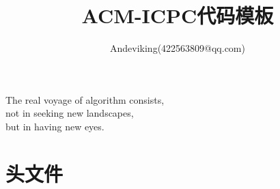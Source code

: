 \documentclass[twocolumn,a4]{article}
\title{\CJKfamily{hei} \bfseries ACM-ICPC代码模板}
\author{Andeviking(422563809@qq.com)}
\begin{document}
\small
\begin{titlepage}
    \maketitle
    \vspace{10cm}
    \hspace{5cm}
    \slshape
    \begin{LARGE}
        The real voyage of algorithm consists,\\
        \hspace*{5.5cm}
        not in seeking new landscapes,\\
        \hspace*{5.5cm}
        but in having new eyes.
    \end{LARGE}
\end{titlepage}

\newpage
\tableofcontents
\pagestyle{empty}
\renewcommand{\contentsname}{目录}
\newpage\clearpage
\newpage
\pagestyle{fancy}
\setcounter{page}{1}   %

\section{头文件}
\end{document}
